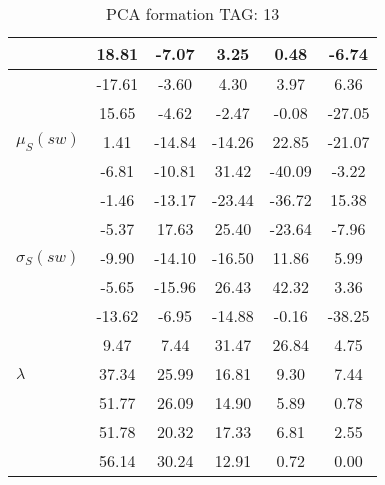 \begin{table}[h!]
\begin{center}
\begin{tabular}{| l | c | c | c | c | c |}
 & 18.81  & -7.07  & 3.25  & 0.48  & -6.74 \\\hline
 & -17.61  & -3.60  & 4.30  & 3.97  & 6.36 \\\hline
 & 15.65  & -4.62  & -2.47  & -0.08  & -27.05 \\\hline
$\mu_S(sw)$ & 1.41  & -14.84  & -14.26  & 22.85  & -21.07 \\\hline
 & -6.81  & -10.81  & 31.42  & -40.09  & -3.22 \\\hline
 & -1.46  & -13.17  & -23.44  & -36.72  & 15.38 \\\hline
 & -5.37  & 17.63  & 25.40  & -23.64  & -7.96 \\\hline
$\sigma_S(sw)$ & -9.90  & -14.10  & -16.50  & 11.86  & 5.99 \\\hline
 & -5.65  & -15.96  & 26.43  & 42.32  & 3.36 \\\hline
 & -13.62  & -6.95  & -14.88  & -0.16  & -38.25 \\\hline
 & 9.47  & 7.44  & 31.47  & 26.84  & 4.75 \\\hline
$\lambda$ & 37.34  & 25.99  & 16.81  & 9.30  & 7.44 \\\hline
 & 51.77  & 26.09  & 14.90  & 5.89  & 0.78 \\\hline
 & 51.78  & 20.32  & 17.33  & 6.81  & 2.55 \\\hline
 & 56.14  & 30.24  & 12.91  & 0.72  & 0.00 \\\hline
\end{tabular}
\caption{PCA formation TAG: 13}
\end{center}
\end{table}